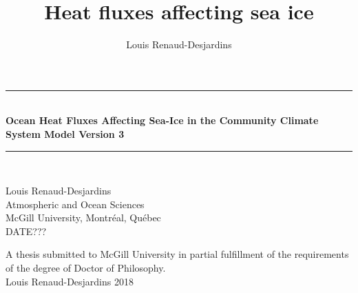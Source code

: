 \documentclass[12pt]{article}
\title{Heat fluxes affecting sea ice}
\author{Louis Renaud-Desjardins}
\numberwithin{equation}{section}
\numberwithin{table}{section}
\begin{document}
\thispagestyle{empty}
\begin{center}
\begin{minipage}{0.75\linewidth}
    \centering
    {\LARGE \rule{\textwidth}{0.4pt} \\ \textbf{Ocean Heat Fluxes Affecting Sea-Ice in the Community Climate System Model Version 3} \par \rule{\textwidth}{0.4pt}\\}
    \vspace{5cm}
    {\large Louis Renaud-Desjardins  \\ Atmospheric and Ocean Sciences \\ McGill University, Montréal, Québec \\ DATE??? \par}
    \vspace{6cm}
    { A thesis submitted to McGill University in partial fulfillment of the requirements of the degree of Doctor of Philosophy. \\ \textcopyright Louis Renaud-Desjardins 2018\par}
\end{minipage}
\end{center}
\clearpage







\tableofcontents
\pagebreak
{}
\listoffigures
\pagebreak
{}
\listoftables
\pagebreak














\end{document}
